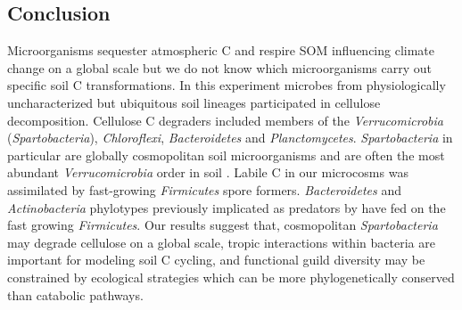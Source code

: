 \subsection{Conclusion} 
Microorganisms sequester atmospheric C and respire SOM influencing climate
change on a global scale but we do not know which microorganisms carry out
specific soil C transformations. In this experiment microbes from
physiologically uncharacterized but ubiquitous soil lineages participated in
cellulose decomposition. Cellulose C degraders included members of the
\textit{Verrucomicrobia} (\textit{Spartobacteria}), \textit{Chloroflexi},
\textit{Bacteroidetes} and \textit{Planctomycetes}. \textit{Spartobacteria} in
particular are globally cosmopolitan soil microorganisms and are often the most
abundant \textit{Verrucomicrobia} order in soil \citep{Bergmann_2011}. Labile
C in our microcosms was assimilated by fast-growing \textit{Firmicutes} spore
formers. \textit{Bacteroidetes} and \textit{Actinobacteria} phylotypes
previously implicated as predators by have fed on the fast growing
\textit{Firmicutes}. Our results suggest that, cosmopolitan
\textit{Spartobacteria} may degrade cellulose on a global scale, tropic
interactions within bacteria are important for modeling soil C cycling, and 
functional guild diversity may be constrained by ecological strategies which
can be more phylogenetically conserved than catabolic pathways.
